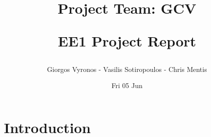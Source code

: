 \documentclass{report}
\title{
	\begin{large}
		{Project Team: GCV}\\
	\end{large}
	\textbf
	{EE1 Project Report}}
\author{Giorgos Vyronos - Vasilis Sotiropoulos - Chris Mentis}
\date{ Fri 05 Jun}
\begin{document}
	\maketitle
	\newpage
	
	\tableofcontents
	\newpage

	\section{Introduction}

	
\end{document}
